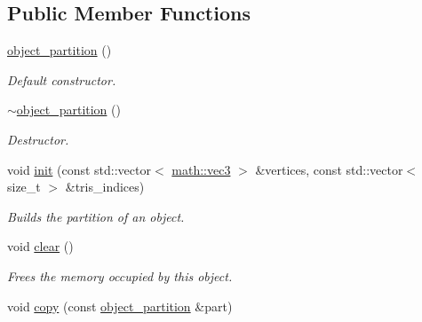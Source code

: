 \subsection*{Public Member Functions}
\begin{DoxyCompactItemize}
\item 
\mbox{\label{classphysim_1_1structures_1_1object__partition_ae04de0339b0dd80bde620b8ad2dd6243}} 
\hyperlink{classphysim_1_1structures_1_1object__partition_ae04de0339b0dd80bde620b8ad2dd6243}{object\+\_\+partition} ()
\begin{DoxyCompactList}\small\item\em Default constructor. \end{DoxyCompactList}\item 
\mbox{\label{classphysim_1_1structures_1_1object__partition_a72207ca60dc87fd04801d6e932f46348}} 
\hyperlink{classphysim_1_1structures_1_1object__partition_a72207ca60dc87fd04801d6e932f46348}{$\sim$object\+\_\+partition} ()
\begin{DoxyCompactList}\small\item\em Destructor. \end{DoxyCompactList}\item 
void \hyperlink{classphysim_1_1structures_1_1object__partition_ab05a750f356257799e80f977a0f92ddd}{init} (const std\+::vector$<$ \hyperlink{structphysim_1_1math_1_1vec3}{math\+::vec3} $>$ \&vertices, const std\+::vector$<$ size\+\_\+t $>$ \&tris\+\_\+indices)
\begin{DoxyCompactList}\small\item\em Builds the partition of an object. \end{DoxyCompactList}\item 
\mbox{\label{classphysim_1_1structures_1_1object__partition_a2bbf4fa99ef6a7dfc76df753e7f05c12}} 
void \hyperlink{classphysim_1_1structures_1_1object__partition_a2bbf4fa99ef6a7dfc76df753e7f05c12}{clear} ()
\begin{DoxyCompactList}\small\item\em Frees the memory occupied by this object. \end{DoxyCompactList}\item 
void \hyperlink{classphysim_1_1structures_1_1object__partition_ab3916ebd7be8c1d6404252cd413aa0db}{copy} (const \hyperlink{classphysim_1_1structures_1_1object__partition}{object\+\_\+partition} \&part)

\end{DoxyCompactItemize}
